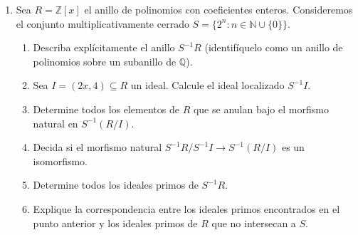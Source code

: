 \documentclass{article}
\theoremstyle{definition}
\theoremstyle{remark}
\numberwithin{equation}{section}
\begin{document}
\begin{enumerate}
\begin{enumerate}
\begin{proof}
    \end{proof}
    \item Identifique explícitamente dicho ideal maximal en términos de los ideales de $R$.
\end{enumerate}


\item 
Sea $R = \mathbb{Z}[x]$ el anillo de polinomios con coeficientes enteros. Consideremos el conjunto multiplicativamente cerrado $S = \{2^n : n \in \mathbb{N} \cup \{0\}\}$.

\begin{enumerate}
    \item Describa explícitamente el anillo $S^{-1}R$ (identifíquelo como un anillo de polinomios sobre un subanillo de $\mathbb{Q}$).
    \item Sea $I = (2x, 4) \subseteq R$ un ideal. Calcule el ideal localizado $S^{-1}I$.
    \item Determine todos los elementos de $R$ que se anulan bajo el morfismo natural en $S^{-1}(R/I)$.
    \item Decida si el morfismo natural $S^{-1}R / S^{-1}I \to S^{-1}(R/I)$ es un isomorfismo.
    \item Determine todos los ideales primos de $S^{-1}R$.
    \item Explique la correspondencia entre los ideales primos encontrados en el punto anterior y los ideales primos de $R$ que no intersecan a $S$.
\end{enumerate}
\end{enumerate}
\end{document}
